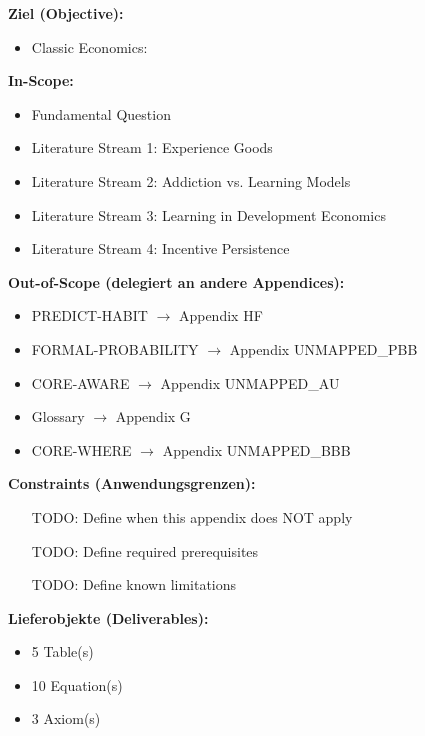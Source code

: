\documentclass[11pt, a4paper]{article}
\begin{document}
\begin{tcolorbox}[
    colback=orange!5!white,
    colframe=orange!75!black,
    title={\textbf{Appendix Scope: Ziel / In-Scope / Out-of-Scope / Constraints}},
    fonttitle=\bfseries
]

\textbf{Ziel (Objective):}
\begin{itemize}[nosep]
    \item Classic Economics:
\end{itemize}

\textbf{In-Scope:}
\begin{itemize}[nosep]
    \item Fundamental Question
    \item Literature Stream 1: Experience Goods
    \item Literature Stream 2: Addiction vs. Learning Models
    \item Literature Stream 3: Learning in Development Economics
    \item Literature Stream 4: Incentive Persistence
\end{itemize}

\textbf{Out-of-Scope (delegiert an andere Appendices):}
\begin{itemize}[nosep]
    \item PREDICT-HABIT $\rightarrow$ Appendix HF
    \item FORMAL-PROBABILITY $\rightarrow$ Appendix UNMAPPED_PBB
    \item CORE-AWARE $\rightarrow$ Appendix UNMAPPED_AU
    \item Glossary $\rightarrow$ Appendix G
    \item CORE-WHERE $\rightarrow$ Appendix UNMAPPED_BBB
\end{itemize}

\textbf{Constraints (Anwendungsgrenzen):}
\begin{itemize}[nosep]
    \item [TODO: Define when this appendix does NOT apply]
    \item [TODO: Define required prerequisites]
    \item [TODO: Define known limitations]
\end{itemize}

\textbf{Lieferobjekte (Deliverables):}
\begin{itemize}[nosep]
    \item 5 Table(s)
    \item 10 Equation(s)
    \item 3 Axiom(s)
\end{itemize}

\end{tcolorbox}
\end{document}
